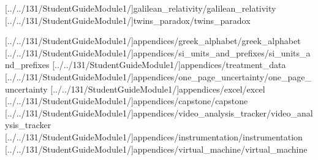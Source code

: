 \documentclass[english,twoside]{article}
\begin{document}

[../../131/StudentGuideModule1/]{galilean_relativity/galilean_relativity}
[../../131/StudentGuideModule1/]{twins_paradox/twins_paradox}

\startappendix

\newcommand{\GreekLettersUsed}{alpha, beta, delta, Delta, epsilon, eta, theta, kappa, lambda, mu, pi, rho, Sigma, sigma, tau, Phi, phi, Omega, omega}
[../../131/StudentGuideModule1/]{appendices/greek_alphabet/greek_alphabet}
[../../131/StudentGuideModule1/]{appendices/si_units_and_prefixes/si_units_and_prefixes}
[../../131/StudentGuideModule1/]{appendices/treatment_data}
[../../131/StudentGuideModule1/]{appendices/one_page_uncertainty/one_page_uncertainty}
[../../131/StudentGuideModule1/]{appendices/excel/excel}
[../../131/StudentGuideModule1/]{appendices/capstone/capstone}
[../../131/StudentGuideModule1/]{appendices/video_analysis_tracker/video_analysis_tracker}
[../../131/StudentGuideModule1/]{appendices/instrumentation/instrumentation}
[../../131/StudentGuideModule1/]{appendices/virtual_machine/virtual_machine}

\end{document}
